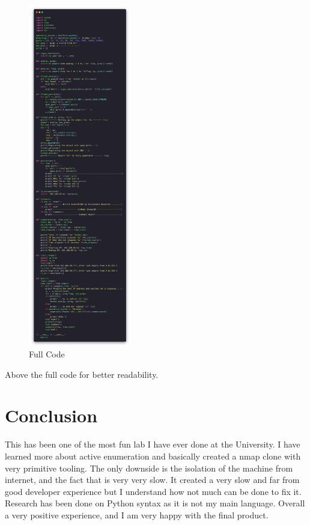 \begin{figure}[H]
  \centering
  \includegraphics[width=0.4\textwidth]{figures/code/enum-full-code}
  \caption{Full Code}
  \label{f:enum-full-code}
\end{figure}
Above the full code for better readability.

\section{Conclusion}
\label{s:lab2-conclusion}
This has been one of the most fun lab I have ever done at the University. I have
learned more about active enumeration and basically created a nmap clone with
very primitive tooling. The only downside is the isolation of the machine from
internet, and the fact that is very very slow. It created a very slow and far
from good developer experience but I understand how not much can be done to fix
it. Research has been done on Python syntax as it is not my main language.
Overall a very positive experience, and I am very happy with the final product.
